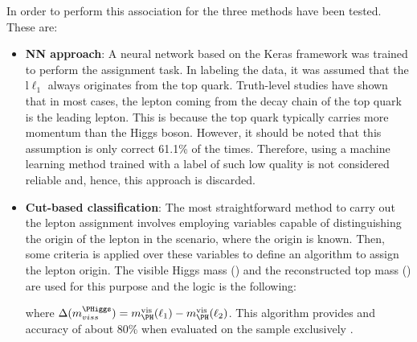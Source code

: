 In order to perform this association for the \dilepSStau three methods %
have been tested. These are: %
\begin{itemize}
	\item \textbf{NN approach}:  A neural network based on the Keras framework 
	was trained to perform the assignment task. In labeling the data, it was assumed 
	that the l$\ell_{1}$ always originates from the top quark. Truth-level studies have 
	shown that in most cases, the lepton coming from the decay chain of the top quark 
	is the leading lepton. This is because the top quark typically carries more momentum 
	than the Higgs boson. However, it should be noted that this assumption is only correct 
	61.1\% of the times. Therefore, using a machine learning method trained with a label 
	of such low quality is not considered reliable and, hence, this approach is discarded. 
	
	
	\item \textbf{Cut-based classification}: The most straightforward method to carry 
	out the lepton assignment involves employing variables capable of distinguishing 
	the origin of the lepton in the \dilepOStau scenario, where the origin is known. 
	Then, some criteria is applied over these variables to define an algorithm to
	assign the lepton origin. The visible Higgs mass (\Hvismass) and the reconstructed 
	top mass (\toprecomass) are used for this purpose and the logic is the following:
	
	where $\Delta(m_{viss}^{\PHiggs}) = \Hvismass(\ell_{1}) - \Hvismass(\ell_{2})$. 
	This algorithm provides and accuracy of about 80\% when evaluated on the
	\dilepOStau sample exclusively .


\end{itemize}
